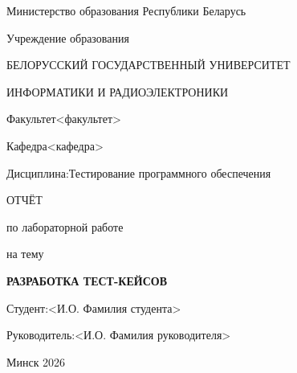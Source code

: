\documentclass[a4paper,14pt]{extarticle}
\begin{document}
\begin{titlepage}
\centering
Министерство образования Республики Беларусь\par
\vspace{\baselineskip}
Учреждение образования\par
БЕЛОРУССКИЙ ГОСУДАРСТВЕННЫЙ УНИВЕРСИТЕТ\par
ИНФОРМАТИКИ И РАДИОЭЛЕКТРОНИКИ\par
\vspace{\baselineskip}
\vspace{\baselineskip}
\noindent Факультет\hspace{1em}<факультет>\par
\vspace{\baselineskip}
\noindent Кафедра\hspace{1em}<кафедра>\par
\vspace{\baselineskip}
\noindent Дисциплина:\hspace{1em}Тестирование программного обеспечения\par
\vspace{\baselineskip}
\vspace{\baselineskip}
ОТЧЁТ\par
по лабораторной работе\par
на тему\par
\vspace{\baselineskip}
\textbf{РАЗРАБОТКА ТЕСТ-КЕЙСОВ}\par
\vspace{\baselineskip}
\vspace{\baselineskip}
\vspace{\baselineskip}
\vspace{\baselineskip}
\noindent Студент:\hfill <И.О. Фамилия студента>\par
\vspace{\baselineskip}
\vspace{\baselineskip}
\noindent Руководитель:\hfill <И.О. Фамилия руководителя>\par
\vspace{\baselineskip}
\vspace{\baselineskip}
\vspace{\baselineskip}
\vspace{\baselineskip}
\vspace{\baselineskip}
\vspace{\baselineskip}
\vspace{\baselineskip}
\vspace{\baselineskip}
Минск 2026\par
\end{titlepage}
\end{document}
